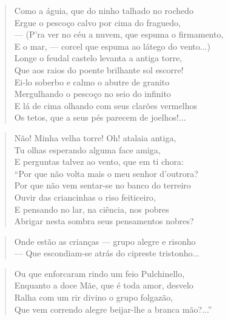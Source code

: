 \begin{anexosenv}
\begin{verse}
Como a águia, que do ninho talhado no rochedo \\
Ergue o pescoço calvo por cima do fraguedo, \\
— (P'ra ver no céu a nuvem, que espuma o firmamento, \\
E o mar, — corcel que espuma ao látego do vento...) \\
Longe o feudal castelo levanta a antiga torre, \\
Que aos raios do poente brilhante sol escorre! \\
Ei-lo soberbo e calmo o abutre de granito \\
Mergulhando o pescoço no seio do infinito \\
E lá de cima olhando com seus clarões vermelhos \\
Os tetos, que a seus pés parecem de joelhos!... \\
\end{verse}

\begin{verse}
Não! Minha velha torre! Oh! atalaia antiga, \\
Tu olhas esperando alguma face amiga, \\
E perguntas talvez ao vento, que em ti chora: \\
``Por que não volta mais o meu senhor d'outrora? \\
Por que não vem sentar-se no banco do terreiro \\
Ouvir das criancinhas o riso feiticeiro, \\
E pensando no lar, na ciência, nos pobres \\
Abrigar nesta sombra seus pensamentos nobres? \\
\end{verse}

\begin{verse}
Onde estão as crianças — grupo alegre e risonho \\
— Que escondiam-se atrás do cipreste tristonho... \\
\end{verse}

\begin{verse}
Ou que enforcaram rindo um feio Pulchinello, \\
Enquanto a doce Mãe, que é toda amor, desvelo \\
Ralha com um rir divino o grupo folgazão, \\
Que vem correndo alegre beijar-lhe a branca mão?...'' \\
\end{verse}


\end{anexosenv}
